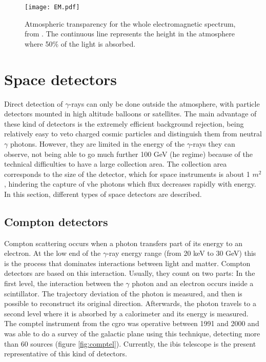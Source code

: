 \documentclass[main.tex]{subfiles}
\begin{document}
\begin{figure}
\centering
 \texttt{[image: EM.pdf]}
  \caption{Atmospheric transparency for the whole electromagnetic spectrum, from \cite{highenergyastrophy}. The continuous line represents the height in the atmosphere where 50\% of the light is absorbed.}
    \label{fig:atmoabsorb}
\end{figure}


\section{Space detectors} \label{sec:spacedet}

Direct detection of $\gamma$-rays can only be done outside the atmosphere, with particle detectors mounted in high altitude balloons or satellites. The main advantage of these kind of detectors is the extremely efficient background rejection, being relatively easy to veto charged cosmic particles and distinguish them from neutral $\gamma$ photons. However, they are limited in the energy of the $\gamma$-rays they can observe, not being able to go much further 100 GeV (\gls{he} regime) because of the technical difficulties to have a large collection area. The collection area corresponds to the size of the detector, which for space instruments is about 1 $m^2$, hindering the capture of \gls{vhe} photons which flux decreases rapidly with energy.\\
In this section, different types of space detectors are described.\\

\subsection{Compton detectors}\label{sec:comptondetectors}

Compton scattering occurs when a photon transfers part of its energy to an electron. At the low end of the $\gamma$-ray energy range (from 20 keV to 30 GeV) this is the process that dominates interactions between light and matter. Compton detectors are based on this interaction. Usually, they count on two parts: In the first level, the interaction between the $\gamma$ photon and an electron occurs inside a scintillator. The trajectory deviation of the photon is measured, and then is possible to reconstruct its original direction. Afterwards, the photon travels to a second level where it is absorbed by a calorimeter and its energy is measured. The \gls{comptel} instrument from the \gls{cgro} was operative between 1991 and 2000 and was able to do a survey of the galactic plane using this technique, detecting more than 60 sources (figure \ref{fig:comptel}). Currently, the \gls{ibis} \cite{IBIS} telescope \cite{INTEGRAL} is the present representative of this kind of detectors.
\end{document}
